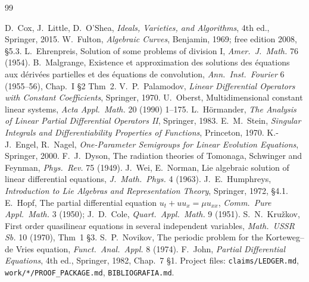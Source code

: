 \documentclass[11pt,a4paper,oneside]{report}
\begin{document}


\begin{thebibliography}{99}\small
{}
 D.~Cox, J.~Little, D.~O'Shea, \emph{Ideals, Varieties, and Algorithms}, 4th ed., Springer, 2015.
 W.~Fulton, \emph{Algebraic Curves}, Benjamin, 1969; free edition 2008, \S5.3.
 L.~Ehrenpreis, Solution of some problems of division I, \emph{Amer.\ J.\ Math.} 76 (1954).
 B.~Malgrange, Existence et approximation des solutions des \'equations aux d\'eriv\'ees partielles et des \'equations de convolution, \emph{Ann.\ Inst.\ Fourier} 6 (1955--56), Chap.~I \S2 Thm~2.
 V.~P.~Palamodov, \emph{Linear Differential Operators with Constant Coefficients}, Springer, 1970.
 U.~Oberst, Multidimensional constant linear systems, \emph{Acta Appl.\ Math.} 20 (1990) 1--175.
 L.~H\"ormander, \emph{The Analysis of Linear Partial Differential Operators II}, Springer, 1983.
 E.~M.~Stein, \emph{Singular Integrals and Differentiability Properties of Functions}, Princeton, 1970.
 K.-J.~Engel, R.~Nagel, \emph{One-Parameter Semigroups for Linear Evolution Equations}, Springer, 2000.
 F.~J.~Dyson, The radiation theories of Tomonaga, Schwinger and Feynman, \emph{Phys.\ Rev.} 75 (1949).
 J.~Wei, E.~Norman, Lie algebraic solution of linear differential equations, \emph{J.\ Math.\ Phys.} 4 (1963).
 J.~E.~Humphreys, \emph{Introduction to Lie Algebras and Representation Theory}, Springer, 1972, \S4.1.
 E.~Hopf, The partial differential equation $u_t+uu_x=\mu u_{xx}$, \emph{Comm.\ Pure Appl.\ Math.} 3 (1950); J.~D.~Cole, \emph{Quart.\ Appl.\ Math.} 9 (1951).
 S.~N.~Kru\v zkov, First order quasilinear equations in several independent variables, \emph{Math.\ USSR Sb.} 10 (1970), Thm~1 \S3.
 S.~P.~Novikov, The periodic problem for the Korteweg--de Vries equation, \emph{Funct.\ Anal.\ Appl.} 8 (1974).
 F.~John, \emph{Partial Differential Equations}, 4th ed., Springer, 1982, Chap.~7 \S1.
 Project files: \texttt{claims/LEDGER.md}, \texttt{work/*/PROOF\_PACKAGE.md}, \texttt{BIBLIOGRAFIA.md}.
\end{thebibliography}

\end{document}
